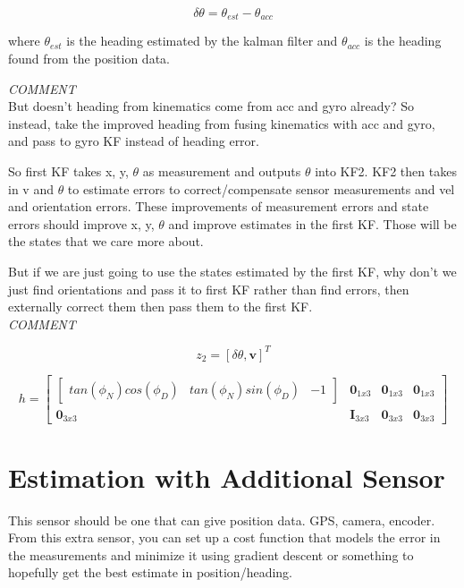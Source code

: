 \begin{equation}
  \delta\theta = \theta_{est} - \theta_{acc}
\end{equation}

where $\theta_{est}$ is the heading estimated by the kalman filter and $\theta_{acc}$ 
is the heading found from the position data. 

\emph{COMMENT} \\
But doesn't heading from kinematics come from acc and gyro already? So instead,
take the improved heading from fusing kinematics with acc and gyro, and pass to 
gyro KF instead of heading error. 

So first KF takes x, y, $\theta$ as measurement and outputs $\theta$ into KF2. 
KF2 then takes in v and $\theta$ to estimate errors to correct/compensate 
sensor measurements and vel and orientation errors. These improvements of 
measurement errors and state errors should improve x, y, $\theta$ and improve 
estimates in the first KF. Those will be the states that we care more about.

But if we are just going to use the states estimated by the first KF, why don't 
we just find orientations and pass it to first KF rather than find errors, then 
externally correct them then pass them to the first KF. 
\\
\emph{COMMENT}

\begin{equation}
  z_2 = [\delta\theta, \boldsymbol{v}]^T
\end{equation}

\begin{equation}
  h = \begin{bmatrix}
      \begin{bmatrix}tan(\phi_N)cos(\phi_D) & tan(\phi_N)sin(\phi_D) & -1\end{bmatrix} & \boldsymbol{0}_{1x3} & \boldsymbol{0}_{1x3} & \boldsymbol{0}_{1x3} \\
      \boldsymbol{0}_{3x3} & \boldsymbol{I}_{3x3} & \boldsymbol{0}_{3x3} & \boldsymbol{0}_{3x3}
      \end{bmatrix}
\end{equation}

\section{Estimation with Additional Sensor}

This sensor should be one that can give position data. GPS, camera, encoder.
From this extra sensor, you can set up a cost function that models the error 
in the measurements and minimize it using gradient descent or something to 
hopefully get the best estimate in position/heading. 


